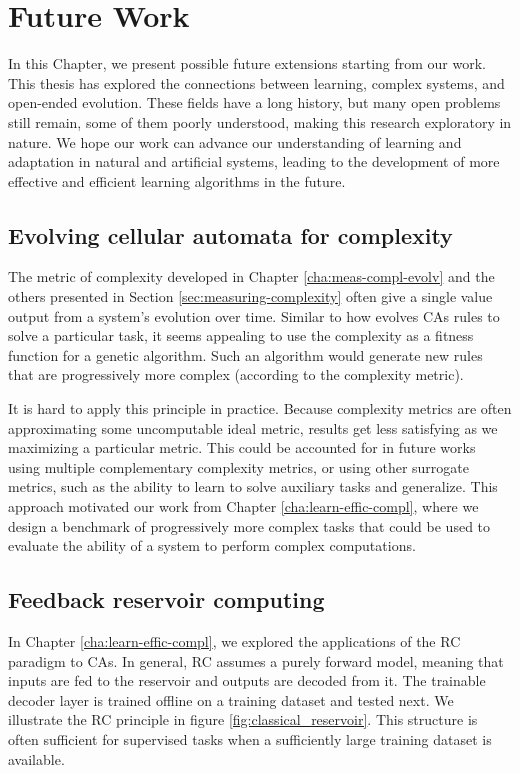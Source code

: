 \chapter{Future Work}

In this Chapter, we present possible future extensions starting from our work.
This thesis has explored the connections between learning, complex systems, and
open-ended evolution. These fields have a long history, but many open problems
still remain, some of them poorly understood, making this research exploratory
in nature. We hope our work can advance our understanding of learning and
adaptation in natural and artificial systems, leading to the development of more
effective and efficient learning algorithms in the future.

\section{Evolving cellular automata for complexity}

The metric of complexity developed in Chapter \ref{cha:meas-compl-evolv} and the
others presented in Section \ref{sec:measuring-complexity} often give a single
value output from a system's evolution over time. Similar to how
\textcite{mitchellEvolvingCellularAutomata1996} evolves \acp{CA} rules to solve
a particular task, it seems appealing to use the complexity as a fitness
function for a genetic algorithm. Such an algorithm would generate new rules
that are progressively more complex (according to the complexity metric).

It is hard to apply this principle in practice. Because complexity metrics are
often approximating some uncomputable ideal metric, results get less satisfying
as we maximizing a particular metric. This could be accounted for in future
works using multiple complementary complexity metrics, or using other surrogate
metrics, such as the ability to learn to solve auxiliary tasks and generalize.
This approach motivated our work from Chapter \ref{cha:learn-effic-compl}, where
we design a benchmark of progressively more complex tasks that could be used to
evaluate the ability of a system to perform complex computations.

\section{Feedback reservoir computing}

In Chapter \ref{cha:learn-effic-compl}, we explored the applications of the
\ac{RC} paradigm to \acp{CA}. In general, \ac{RC} assumes a purely forward
model, meaning that inputs are fed to the reservoir and outputs are decoded from
it. The trainable decoder layer is trained offline on a training dataset and
tested next. We illustrate the \ac{RC} principle in figure
\ref{fig:classical_reservoir}. This structure is often sufficient for supervised
tasks when a sufficiently large training dataset is available.

